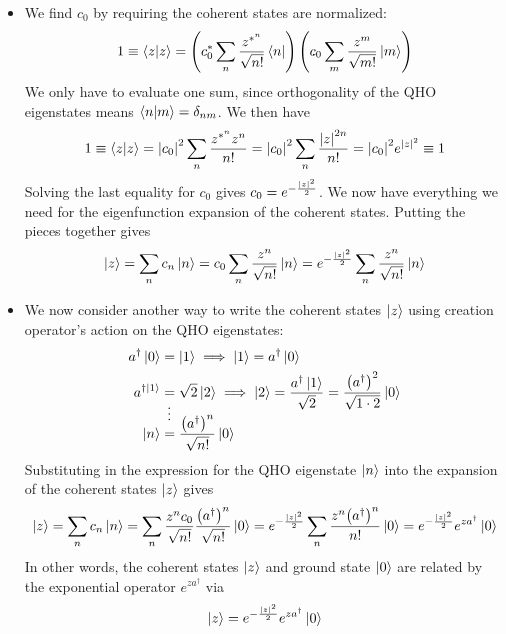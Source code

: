 \documentclass[11pt, a4paper]{article}
\begin{document}
\begin{itemize}
	\item We find $ c_{0} $ by requiring the coherent states are normalized:
	\begin{equation*}
		1 \equiv \braket{z}{z} = \left(c_{0}^{*} \sum_{n} \frac{z^{*^{n}}}{\sqrt{n!}}\bra{n}\right)\left(c_{0} \sum_{m} \frac{z^{m}}{\sqrt{m!}}\ket{m}\right)
	\end{equation*}
	We only have to evaluate one sum, since orthogonality of the QHO eigenstates means $ \braket{n}{m} = \delta_{nm} $. We then have
	\begin{equation*}
		1 \equiv \braket{z}{z} = \abs{c_{0}}^{2} \sum_{n}\frac{z^{*^{n}}z^{n}}{n!} = \abs{c_{0}}^{2}\sum_{n}\frac{\abs{z}^{2n}}{n!} = \abs{c_{0}}^{2}e^{\abs{z}^{2}} \equiv 1
	\end{equation*}
	Solving the last equality for $ c_{0} $  gives $ c_{0} = e^{-\frac{\abs{z}^{2}}{2}} $. We now have everything we need for the eigenfunction expansion of the coherent states. Putting the pieces together gives
	\begin{equation*}
		\ket{z} =  \sum_{n}c_{n} \ket{n} = c_{0} \sum_{n} \frac{z^{n}}{\sqrt{n!}}\ket{n} = e^{-\frac{\abs{z}^{2}}{2}} \sum_{n}\frac{z^{n}}{\sqrt{n!}} \ket{n}
	\end{equation*}
	
	\item We now consider another way to write the coherent states $ \ket{z} $ using creation operator's action on the QHO eigenstates:
	\begin{align*}
		a^{\dagger} \ket{0} &= \ket{1} \implies \ket{1} = a^{\dagger}\ket{0}\\
		a^{\dagger \ket{1}} &= \sqrt{2}\ket{2} \implies \ket{2} = \frac{a^{\dagger}\ket{1}}{\sqrt{2}} = \frac{\big(a^{\dagger}\big)^{2}}{\sqrt{1 \cdot 2}} \ket{0}\\[-4mm]
		&\ \, \vdots \\[-4mm]
		\ket{n} &= \frac{\big(a^{\dagger}\big)^{n}}{\sqrt{n!}} \ket{0}
	\end{align*} 
	Substituting in the expression for the QHO eigenstate $ \ket{n} $ into the expansion of the coherent states $ \ket{z} $ gives
	\begin{equation*}
		\ket{z} = \sum_{n}c_{n}\ket{n} = \sum_{n}\frac{z^{n}c_{0}}{\sqrt{n!}} \frac{\big(a^{\dagger}\big)^{n}}{\sqrt{n!}} \ket{0} = e^{-\frac{\abs{z}^{2}}{2}} \sum_{n} \frac{z^{n}\big(a^{\dagger}\big)^{n}}{n!} \ket{0} =  e^{-\frac{\abs{z}^{2}}{2}}  e^{za^{\dagger}} \ket{0}
	\end{equation*}
	In other words, the coherent states $ \ket{z} $ and ground state $ \ket{0} $ are related by the exponential operator $ e^{za^{\dagger}} $ via
	\begin{equation*}
		\ket{z} =  e^{-\frac{\abs{z}^{2}}{2}}  e^{za^{\dagger}} \ket{0}
	\end{equation*}
	

\end{itemize}
\end{document}

